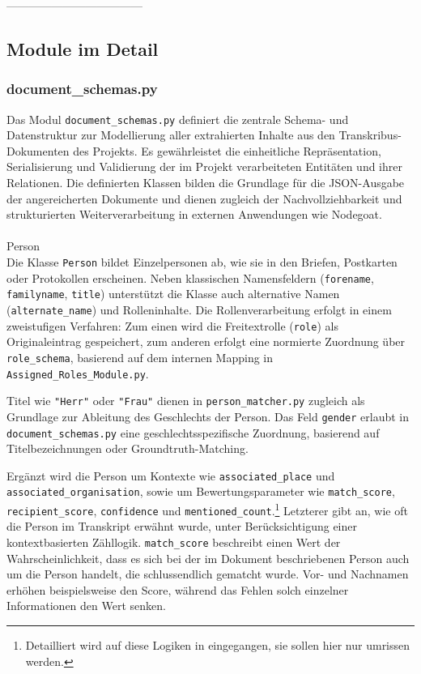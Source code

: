 \documentclass[12pt, a4paper, ngerman, bidi=default]{article}
\makeatletter
\newcommand{\code}[1]{\colorbox{VeryLightGray}{\texttt{#1}}} %
\let\oldparagraph\paragraph%
\renewcommand{\paragraph}{
    \@ifstar%
      \xxxParagraphStar%
      \xxxParagraphNoStar%
 }
\newcommand{\xxxParagraphStar}[1]{\oldparagraph*{#1}\mbox{}}
\newcommand{\xxxParagraphNoStar}[1]{\oldparagraph{#1}\mbox{}}
\makeatother
\begin{document}
------------------------------------


\subsection{Module im Detail}
\subsubsection{document\_schemas.py}\label{subsec:document_schema}
Das Modul \code{document\_schemas.py} definiert die zentrale Schema- und Datenstruktur 
zur Modellierung aller extrahierten Inhalte aus den Transkribus-Dokumenten des Projekts. Es gewährleistet die einheitliche Repräsentation, 
Serialisierung und Validierung der im Projekt verarbeiteten Entitäten und ihrer Relationen. Die definierten Klassen bilden die Grundlage für die JSON-Ausgabe der angereicherten Dokumente und dienen zugleich der Nachvollziehbarkeit und strukturierten Weiterverarbeitung in externen Anwendungen wie Nodegoat.

\paragraph{Person}\\
Die Klasse \code{Person} bildet Einzelpersonen ab, wie sie in den Briefen, Postkarten oder Protokollen erscheinen. 
Neben klassischen Namensfeldern (\code{forename}, \code{familyname}, \code{title}) unterstützt die Klasse auch 
alternative Namen (\code{alternate\_name}) und Rolleninhalte. Die Rollenverarbeitung erfolgt in einem zweistufigen Verfahren:
Zum einen wird die Freitextrolle (\code{role}) als Originaleintrag gespeichert, zum anderen erfolgt eine normierte 
Zuordnung über \code{role\_schema}, basierend auf dem internen Mapping in \code{Assigned\_Roles\_Module.py}. 

Titel wie \code{"Herr"} oder \code{"Frau"} dienen in \code{person\_matcher.py} zugleich als Grundlage zur 
Ableitung des Geschlechts der Person. Das Feld \code{gender} erlaubt in \code{document\_schemas.py} eine 
geschlechtsspezifische Zuordnung, basierend auf Titelbezeichnungen oder Groundtruth-Matching. 

Ergänzt wird die Person um Kontexte wie \code{associated\_place} und \code{associated\_organisation}, sowie um Bewertungsparameter 
wie \code{match\_score}, \code{recipient\_score}, \code{confidence} und \code{mentioned\_count}.\footnote{Detailliert wird auf diese Logiken in 
 eingegangen, sie sollen hier nur umrissen werden.} 
Letzterer gibt an, wie oft 
die Person im Transkript erwähnt wurde, unter Berücksichtigung einer kontextbasierten Zähllogik.
\code{match\_score} beschreibt einen Wert der Wahrscheinlichkeit, dass es sich bei der im Dokument beschriebenen Person auch 
um die Person handelt, die schlussendlich gematcht wurde. Vor- und Nachnamen erhöhen beispielsweise den Score, während das
Fehlen solch einzelner Informationen den Wert senken. 
\end{document}
